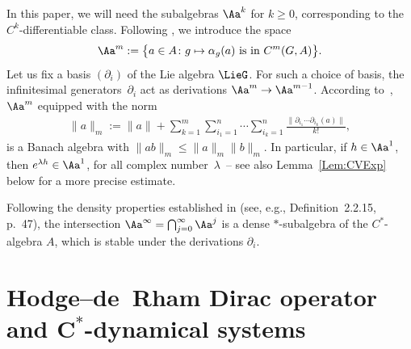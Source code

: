 In this paper, we will need the subalgebras $\Aa^k$ for $k \geqslant 0$, corresponding to the $C^k$-dif\/fe\-ren\-tiab\-le class. Following \cite[Section~2.2]{DerivBratteli}, we introduce the space
\begin{gather*}
\Aa^m := \big\{ a \in A\colon g \mapsto \alpha_g(a) \text{ is in }C^m(G, A) \big\}.
\end{gather*}
Let us f\/ix a basis $(\partial _i)$ of the Lie algebra $\LieG$. For such a choice of basis, the inf\/initesimal genera\-tors~$\partial _i$ act as derivations $\Aa^m \to \Aa^{m-1}$. According to~\cite[Example~2.2.4, p.~41]{DerivBratteli}, $\Aa^m$ equipped with the norm
\begin{gather*}
\| a \|_m := \|a \| + \sum_{k=1}^m \sum_{i_1=1}^n \cdots \sum_{i_k=1}^n \frac{\| \partial_{i_1} \cdots \partial_{i_k}(a) \|}{k !},
\end{gather*}
is a Banach algebra with $\|a b \|_m \leqslant \| a \|_m \| b\|_m$. In particular, if $h \in \Aa^1$, then $e^{\lambda h} \in \Aa^1$, for all complex number~$\lambda$~-- see also Lemma~\ref{Lem:CVExp} below for a more precise estimate.

Following the density properties established in \cite{DerivBratteli} (see, e.g., Def\/inition~2.2.15, p.~47), the intersection $\Aa^\infty = \bigcap_{j=0}^\infty \Aa^j$ is a dense $*$-subalgebra of the $C^*$-algebra $A$, which is stable under the derivations $\partial _i$.

\section[Hodge--de~Rham Dirac operator and $C^*$-dynamical systems]{Hodge--de~Rham Dirac operator and $\boldsymbol{C^*}$-dynamical systems}
\label{Sec:HodgeOperator}

